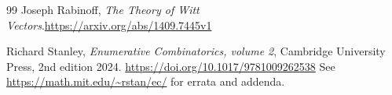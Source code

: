 \documentclass[numbers=enddot,12pt,final,onecolumn,notitlepage]{scrartcl}%
\theoremstyle{definition}
\begin{document}
\begin{thebibliography}{99}
Joseph Rabinoff, \textit{The Theory of Witt
Vectors}.\newline\url{https://arxiv.org/abs/1409.7445v1}

Richard Stanley, \textit{Enumerative Combinatorics,
volume 2}, Cambridge University Press, 2nd edition 2024.\newline%
\url{https://doi.org/10.1017/9781009262538} \newline See
\url{https://math.mit.edu/~rstan/ec/} for errata and addenda.
\end{thebibliography}
\end{document}
